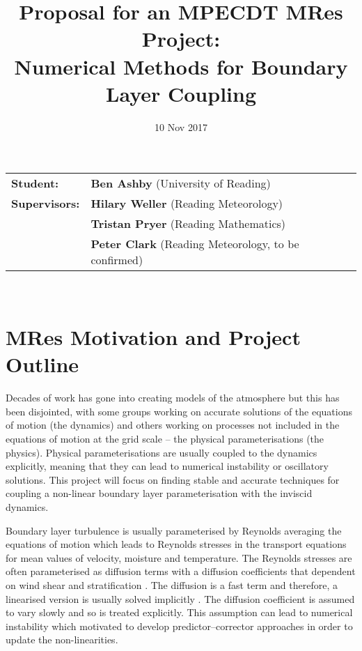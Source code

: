 \documentclass[12pt,a4paper]{article}
\begin{document}
 
\title{\vspace{-2cm}Proposal for an MPECDT MRes Project: \\
Numerical Methods for Boundary Layer Coupling\vspace{-1.3cm}}
\author{}
\date{10 Nov 2017\vspace{-0.7cm}}
\maketitle

\thispagestyle{empty}

\noindent
\begin{tabular}{ll}
\bf Student: & {\bf Ben Ashby} (University of Reading)\\
\bf Supervisors: & {\bf Hilary Weller} (Reading Meteorology)\\
            & {\bf Tristan Pryer} (Reading Mathematics)\\
            & {\bf Peter Clark} (Reading Meteorology, to be confirmed)\\
\end{tabular} \ \\

\section*{MRes Motivation and Project Outline}

Decades of work has gone into creating models of the atmosphere but this has been disjointed, with some groups working on accurate solutions of the equations of motion (the dynamics) and others working on processes not included in the equations of motion at the grid scale -- the physical parameterisations (the physics). Physical parameterisations are usually coupled to the dynamics explicitly, meaning that they can lead to numerical instability or oscillatory solutions. This project will focus on finding stable and accurate techniques for coupling a non-linear boundary layer parameterisation with the inviscid dynamics. 

Boundary layer turbulence is usually parameterised by Reynolds averaging the equations of motion which leads to Reynolds stresses in the transport equations for mean values of velocity, moisture and temperature. The Reynolds stresses are often parameterised as diffusion terms with a diffusion coefficients that dependent on wind shear and stratification \cite[eg][]{HP96,LBB+00,SvH06}. The diffusion is a fast term and therefore, a linearised version is usually solved implicitly \cite[eg][]{KK88}. The diffusion coefficient is assumed to vary slowly and so is treated explicitly. This assumption can lead to numerical instability which motivated \cite{CS03,DWS06} to develop predictor--corrector approaches in order to update the non-linearities. 
\end{document}
